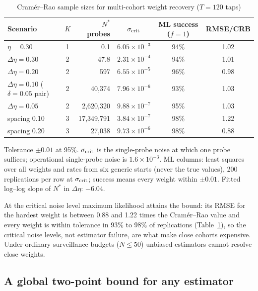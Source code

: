 \begin{table}[t]\centering\small
\begin{threeparttable}
\caption{Cram\'er--Rao sample sizes for multi-cohort weight recovery ($T=120$ taps)}\label{p1:tab:crb}
\begin{tabular}{lcrccc}
\toprule
Scenario & $K$ & $N^*$ probes & $\sigma_{\rm crit}$ & ML success ($f=1$) & RMSE/CRB\\
\midrule
$\eta=0.30$ & 1 & 0.1 & $6.05\times10^{-3}$ & 94\% & 1.02\\
$\Delta\eta=0.30$ & 2 & 47.8 & $2.31\times10^{-4}$ & 94\% & 1.01\\
$\Delta\eta=0.20$ & 2 & 597 & $6.55\times10^{-5}$ & 96\% & 0.98\\
$\Delta\eta=0.10$ ($\delta=0.05$ pair) & 2 & 40{,}374 & $7.96\times10^{-6}$ & 93\% & 1.03\\
$\Delta\eta=0.05$ & 2 & 2{,}620{,}320 & $9.88\times10^{-7}$ & 95\% & 1.03\\
spacing 0.10 & 3 & 17{,}349{,}791 & $3.84\times10^{-7}$ & 98\% & 1.22\\
spacing 0.20 & 3 & 27{,}038 & $9.73\times10^{-6}$ & 98\% & 0.88\\
\bottomrule
\end{tabular}
\begin{tablenotes}\footnotesize\item Tolerance $\pm0.01$ at 95\%. $\sigma_{\rm crit}$ is the single-probe noise at which one probe suffices; operational single-probe noise is $1.6\times10^{-3}$. ML columns: least squares over all weights and rates from six generic starts (never the true values), 200 replications per row at $\sigma_{\rm crit}$; success means every weight within $\pm0.01$. Fitted log--log slope of $N^*$ in $\Delta\eta$: $-6.04$. \end{tablenotes}
\end{threeparttable}
\end{table}

At the critical noise level maximum likelihood attains the bound: its RMSE for the hardest weight is between 0.88 and 1.22 times the Cram\'er--Rao value and every weight is within tolerance in 93\% to 98\% of replications (Table~\ref{p1:tab:crb}), so the critical noise levels, not estimator failure, are what make close cohorts expensive. Under ordinary surveillance budgets ($N\le50$) unbiased estimators cannot resolve close weights.

\subsection{A global two-point bound for any estimator}

